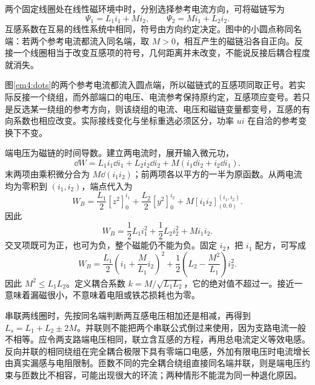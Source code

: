 两个固定线圈处在线性磁环境中时，分别选择参考电流方向，可将磁链写为
\[\Psi_1=L_1i_1+Mi_2,\qquad \Psi_2=Mi_1+L_2i_2.\]
互感系数在互易的线性系统中相同，符号由方向约定决定。图中的小圆点称同名端：若两个参考电流都流入同名端，取 $M>0$，相互产生的磁链沿各自正向。反接一个线圈相当于改变互感项的符号，几何距离并未改变，不能说反接后耦合程度就消失。



图\ref{em4:dots}的两个参考电流都流入圆点端，所以磁链式的互感项同取正号。若实际反接一个绕组，而外部端口的电压、电流参考保持原约定，互感项应变号。若只是反选某一绕组的参考方向，则该绕组的电流、电压和磁链变量都变号，互感的有向系数也相应改变。实际接线变化与坐标重选必须区分，功率 $ui$ 在自洽的参考变换下不变。


端电压为磁链的时间导数。建立两电流时，展开输入微元功，
\[
\dd W=L_1i_1\dd i_1+L_2i_2\dd i_2
+M(i_1\dd i_2+i_2\dd i_1).
\]
末两项由乘积微分合为 $M\dd(i_1i_2)$；前两项各以平方的一半为原函数。从两电流均为零积到 $(i_1,i_2)$，端点代入为
\[
 W_B=\frac{L_1}{2}[z^2]_0^{i_1}
    +\frac{L_2}{2}[y^2]_0^{i_2}
    +M[i_1i_2]_{(0,0)}^{(i_1,i_2)}.
\]
因此
\[W_B=\frac12L_1i_1^2+\frac12L_2i_2^2+Mi_1i_2.\]
交叉项既可为正，也可为负，整个磁能仍不能为负。固定 $i_2$，把 $i_1$ 配方，可写成
\[W_B=\frac{L_1}{2}\left(i_1+\frac{M}{L_1}i_2\right)^2+\frac12\left(L_2-\frac{M^2}{L_1}\right)i_2^2.\]
因此 $M^2\le L_1L_2$。定义耦合系数 $k=M/\sqrt{L_1L_2}$，它的绝对值不超过一。接近一意味着漏磁很小，不意味着电阻或铁芯损耗也为零。

串联两线圈时，先按同名端判断两互感电压相加还是相减，再得到 $L_s=L_1+L_2\pm2M$。并联则不能把两个串联公式倒过来使用，因为支路电流一般不相等。应令两支路端电压相同，联立含互感的方程，再用总电流定义等效电感。反向并联的相同绕组在完全耦合极限下具有零端口电感，外加有限电压时电流增长由真实漏感与电阻限制。匝数不同的完全耦合绕组直接同名端并联，则是端电压约束与匝数比不相容，可能出现很大的环流；两种情形不能混为同一种退化原因。

